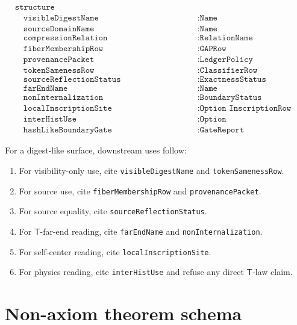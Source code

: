 $$
\begin{aligned}
&\texttt{structure HashLikeApophaticFixedPointPacket :=} \\
&\quad \texttt{visibleDigestName} && : \texttt{Name} \\
&\quad \texttt{sourceDomainName} && : \texttt{Name} \\
&\quad \texttt{compressionRelation} && : \texttt{RelationName} \\
&\quad \texttt{fiberMembershipRow} && : \texttt{GAPRow} \\
&\quad \texttt{provenancePacket} && : \texttt{LedgerPolicy} \\
&\quad \texttt{tokenSamenessRow} && : \texttt{ClassifierRow} \\
&\quad \texttt{sourceReflectionStatus} && : \texttt{ExactnessStatus} \\
&\quad \texttt{farEndName} && : \texttt{Name} \\
&\quad \texttt{nonInternalization} && : \texttt{BoundaryStatus} \\
&\quad \texttt{localInscriptionSite} && : \texttt{Option InscriptionRow} \\
&\quad \texttt{interHistUse} && : \texttt{Option InterHistInvariantRow} \\
&\quad \texttt{hashLikeBoundaryGate} && : \texttt{GateReport}
\end{aligned}
$$

\begin{protocol}
\label{prot:hash-like-packet-use}
For a digest-like surface, downstream uses follow:
\begin{enumerate}
\item For visibility-only use, cite \texttt{visibleDigestName} and \texttt{tokenSamenessRow}.
\item For source use, cite \texttt{fiberMembershipRow} and \texttt{provenancePacket}.
\item For source equality, cite \texttt{sourceReflectionStatus}.
\item For $\mathsf{T}$-far-end reading, cite \texttt{farEndName} and \texttt{nonInternalization}.
\item For self-center reading, cite \texttt{localInscriptionSite}.
\item For physics reading, cite \texttt{interHistUse} and refuse any direct $\mathsf{T}$-law claim.
\end{enumerate}
\end{protocol}

\section{Non-axiom theorem schema}
\label{sec:hash-like-non-axiom-schema}

